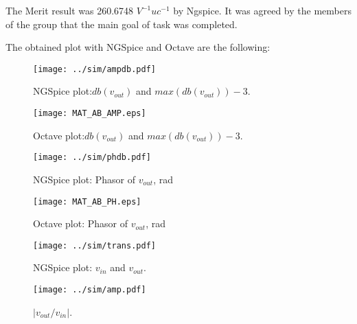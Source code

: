The Merit result was 260.6748 $V^{-1}uc^{-1}$ by Ngspice. It was agreed by the members of the group that the main goal of task was completed.

\newpage
The obtained plot with NGSpice and Octave are the following:

\begin{figure}[h] \centering
	\vspace{-3cm}
	\texttt{[image: ../sim/ampdb.pdf]}
	\caption{NGSpice plot:$db(v_{out})$ and $max(db(v_{out}))-3$.}
	\label{fig:MAT_OUT}
\end{figure}

\begin{figure}[h] \centering
	\texttt{[image: MAT\_AB\_AMP.eps]}
	\caption{Octave plot:$db(v_{out})$ and $max(db(v_{out}))-3$.}
	\label{fig:SIM_OUT}
\end{figure}

\newpage

\begin{figure}[h] \centering
	\vspace{-3cm}
	\texttt{[image: ../sim/phdb.pdf]}
	\caption{NGSpice plot: Phasor of $v_{out}$, rad}
	\label{fig:MAT_PH}
\end{figure}

\begin{figure}[h] \centering
	\texttt{[image: MAT\_AB\_PH.eps]}
	\caption{Octave plot: Phasor of $v_{out}$, rad}
	\label{fig:SIM_PH}
\end{figure}

\newpage

\begin{figure}[h] \centering
	\vspace{-3cm}
	\texttt{[image: ../sim/trans.pdf]}
	\caption{NGSpice plot: $v_{in}$ and $v_{out}$.}
\end{figure}

\begin{figure}[h] \centering
	\vspace{-3cm}
	\texttt{[image: ../sim/amp.pdf]}
	\caption{$ \left | v_{out}/v_{in} \right |$.}
	\vspace{-2cm}
\end{figure}
